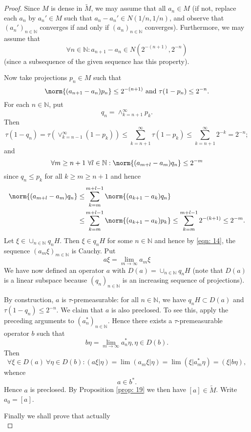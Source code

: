 \begin{proof}
Since $M$ is dense in $\widetilde{M}$, we may assume that all $a_n\in M$ (if not, replace each $a_n$ by $a_n'\in M$ such that $a_n-a_n'\in N(1/n, 1/n)$, and observe that $(a_n')_{n\in \mathbb{N}}$ converges if and only if $(a_n)_{n\in \mathbb{N}}$ converges). Furthermore, we may assume that 
\[
    \forall n\in \mathbb{N}: a_{n+1}-a_n\in N(2^{-(n+1)},2^{-n})  
\]
(since a subsequence of the given sequence has this property).\par
Now take projections $p_n \in M$ such that 
\[
    \norm{(a_{n+1}-a_n)p_n}\leq 2^{-(n+1)} \text{ and } \tau(1-p_n)\leq 2^{-n}.  
\]
For each $n\in \mathbb{N}$, put
\[
    q_n=\wedge_{k=n+1}^\infty p_k.
\]  
Then
\[
    \tau(1-q_n)=\tau\left( \vee_{k=n-1}^\infty (1-p_k) \right)\leq \sum_{k=n+1}^\infty \tau(1-p_k)\leq \sum_{k=n+1}^\infty 2^{-k}=2^{-n};
\]
and
\begin{equation}\label{eqn: 14}
    \forall m\geq n+1~\forall l\in \mathbb{N}:\norm{(a_{m+l}-a_m)q_n}\leq 2^{-m}  
\end{equation}
since $q_n\leq p_k$ for all $k\geq m\geq n+1$ and hence
\[
   \begin{split}
    \norm{(a_{m+l}-a_m)q_n}\leq& \sum_{k=m}^{m+l-1}\norm{(a_{k+1}-a_k)q_n}\\
    \leq& \sum_{k=m}^{m+l-1}\norm{(a_{k+1}-a_k)p_k}\leq \sum_{k=m}^{m+l-1}2^{-(k+1)}\leq 2^{-m}.
   \end{split}
\]
Let $\xi\in \cup_{n\in \mathbb{N}}q_nH$. Then $\xi\in q_nH$ for some $n\in \mathbb{N}$ and hence by \eqref{eqn: 14}, the sequence $(a_m\xi)_{m\in \mathbb{N}}$ is Cauchy. Put
\[
    a\xi=\lim_{m\to \infty}a_m\xi  
\]
We have now defined an operator $a$ with $D(a)=\cup_{n\in \mathbb{N}}q_nH$ (note that $D(a)$ is a linear subspace because $(q_n)_{n\in \mathbb{N}}$ is an increasing sequence of projections).\par 
By construction, $a$ is $\tau$-premeasurable: for all $n\in \mathbb{N}$, we have $q_nH\subset D(a)$ and $\tau(1-q_n)\leq 2^{-n}$. We claim that $a$ is also preclosed. To see this, apply the preceding arguments to $(a_n^*)_{n\in \mathbb{N}}$. Hence there exists a $\tau$-premeasurable operator $b$ such that
\[
  b\eta=\lim_{m\to \infty}a_n^*\eta,\eta\in D(b). 
\] 
Then
\[
    \forall \xi\in D(a)~\forall \eta\in D(b):(a\xi|\eta)=\lim (a_m\xi|\eta)=\lim(\xi|a_m^*\eta)=(\xi|b\eta),
\]
whence
   \[
     a\in b^*.  
   \]
Hence $a$ is preclosed. By Proposition \ref{prop: 19} we then have $[a]\in \widetilde{M}$. Write $a_0=[a]$.\par
Finally we shall prove that actually
\begin{equation}

\end{equation}
\end{proof}
